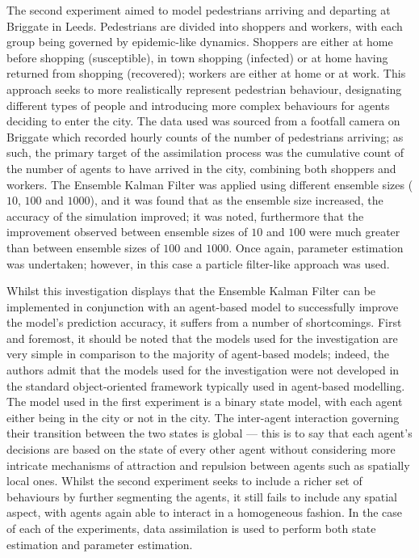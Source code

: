 The second experiment aimed to model pedestrians arriving and departing at
Briggate in Leeds.
Pedestrians are divided into shoppers and workers, with each group being
governed by epidemic-like dynamics.
Shoppers are either at home before shopping (susceptible), in town shopping
(infected) or at home having returned from shopping (recovered); workers are
either at home or at work.
This approach seeks to more realistically represent pedestrian behaviour,
designating different types of people and introducing more complex behaviours
for agents deciding to enter the city.
The data used was sourced from a footfall camera on Briggate which recorded
hourly counts of the number of pedestrians arriving; as such, the primary target
of the assimilation process was the cumulative count of the number of agents to
have arrived in the city, combining both shoppers and workers.
The Ensemble Kalman Filter was applied using different ensemble sizes ($10$,
$100$ and $1000$), and it was found that as the ensemble size increased, the
accuracy of the simulation improved; it was noted, furthermore that the
improvement observed between ensemble sizes of $10$ and $100$ were much greater
than between ensemble sizes of $100$ and $1000$.
Once again, parameter estimation was undertaken; however, in this case a
particle filter-like approach was used.

Whilst this investigation displays that the Ensemble Kalman Filter can be
implemented in conjunction with an agent-based model to successfully improve the
model's prediction accuracy, it suffers from a number of shortcomings.
First and foremost, it should be noted that the models used for the
investigation are very simple in comparison to the majority of agent-based
models; indeed, the authors admit that the models used for the investigation
were not developed in the standard object-oriented framework typically used in
agent-based modelling.
The model used in the first experiment is a binary state model, with each agent
either being in the city or not in the city.
The inter-agent interaction governing their transition between the two states is
global --- this is to say that each agent's decisions are based on the state of
every other agent without considering more intricate mechanisms of attraction
and repulsion between agents \citep{helbing1995social} such as spatially local
ones.
Whilst the second experiment seeks to include a richer set of behaviours by
further segmenting the agents, it still fails to include any spatial aspect,
with agents again able to interact in a homogeneous fashion.
In the case of each of the experiments, data assimilation is used to perform
both state estimation and parameter estimation.

